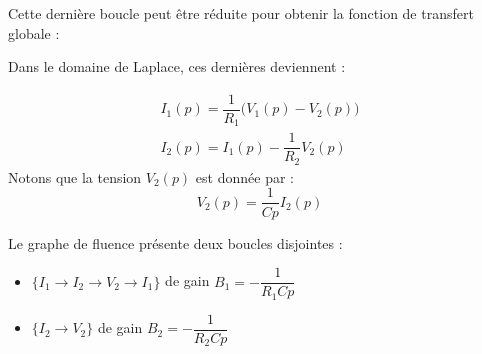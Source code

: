 Cette dernière boucle peut être réduite pour obtenir la fonction de 
transfert globale :
\begin{center}
\end{center}

Dans le domaine de Laplace, ces dernières deviennent :

\begin{align*}
    I_1(p)=\dfrac{1}{R_1}\big(V_1(p)-V_2(p)\big)\\
    I_2(p)=I_1(p)-\dfrac{1}{R_2}V_2(p)
\end{align*}
Notons que la tension $V_2(p)$ est donnée par :
\[
    V_2(p)=\dfrac{1}{Cp}I_2(p)
\]
\begin{center}
    
\end{center}
Le graphe de fluence présente deux boucles disjointes :
\begin{itemize}
    \item $\{I_1\rightarrow I_2\rightarrow V_2\rightarrow I_1\}$ de gain $B_1=-\dfrac{1}{R_1Cp}$ 
    \item $\{I_2\rightarrow V_2\}$ de gain $B_2=-\dfrac{1}{R_2Cp}$ 
\end{itemize}

